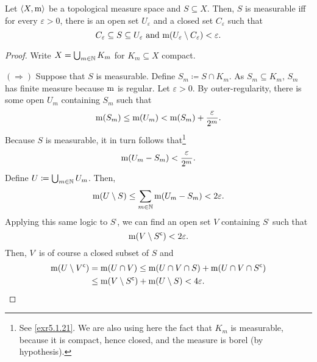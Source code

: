 \begin{prp}\label{prp5.1.39}
Let $\langle X,\mathrm{m}\rangle$ be a topological measure space and $S\subseteq X$.  Then, $S$ is measurable iff for every $\varepsilon >0$, there is an open set $U_{\varepsilon}$ and a closed set $C_{\varepsilon}$ such that
\begin{equation}
C_{\varepsilon}\subseteq S\subseteq U_{\varepsilon}\text{ and }\mathrm{m} (U_{\varepsilon}\setminus C_{\varepsilon})<\varepsilon .
\end{equation}
\begin{proof}
Write $X=\bigcup _{m\in \mathbb{N}}K_m$ for $K_m\subseteq X$ compact.

\blankline
\noindent
$(\Rightarrow )$  Suppose that $S$ is measurable.  Define $S_m\coloneqq S\cap K_m$.  As $S_m\subseteq K_m$, $S_m$ has finite measure because $\mathrm{m}$ is regular.  Let $\varepsilon >0$.  By outer-regularity, there is some open $U_m$ containing $S_m$ such that
\begin{equation}
\mathrm{m} (S_m)\leq \mathrm{m} (U_m)<\mathrm{m} (S_m)+\frac{\varepsilon}{2^m}.
\end{equation}
Because $S$ is measurable, it in turn follows that\footnote{See \cref{exr5.1.21}.  We are also using here the fact that $K_m$ is measurable, because it is compact, hence closed, and the measure is borel (by hypothesis).}
\begin{equation}
\mathrm{m} (U_m-S_m)<\frac{\varepsilon}{2^m}.
\end{equation}
Define $U\coloneqq \bigcup _{m\in \mathbb{N}}U_m$.  Then,
\begin{equation}
\mathrm{m} (U\setminus S)\leq \sum _{m\in \mathbb{N}}\mathrm{m} (U_m-S_m)<2\varepsilon .
\end{equation}
Applying this same logic to $S^{\comp}$, we can find an open set $V$ containing $S^{\comp}$ such that
\begin{equation}
\mathrm{m} (V\setminus S^{\mathsf{c} })<2\varepsilon .
\end{equation}
Then, $V^{\comp}$ is of course a closed subset of $S$ and
\begin{equation}
\begin{split}
\mathrm{m} (U\setminus V^{\mathsf{c}}) & =\mathrm{m} (U\cap V)\leq \mathrm{m} (U\cap V\cap S)+\mathrm{m} (U\cap V\cap S^{\mathsf{c}}) \\
& \leq \mathrm{m} (V\setminus S^{\mathsf{c}})+\mathrm{m} (U\setminus S)<4\varepsilon .
\end{split}
\end{equation}


\end{proof}
\end{prp}
